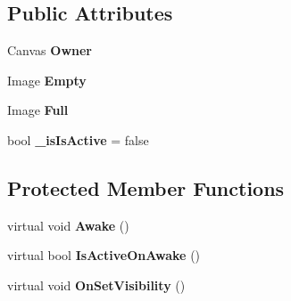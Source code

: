 \subsection*{Public Attributes}
\begin{DoxyCompactItemize}
\item 
\hypertarget{class_skyrates_1_1_u_i_1_1_u_i_state_cooldown_3_01_t_01_4_a4d58720f0cc4a016d95b79027c5e0178}{Canvas {\bfseries Owner}}\label{class_skyrates_1_1_u_i_1_1_u_i_state_cooldown_3_01_t_01_4_a4d58720f0cc4a016d95b79027c5e0178}

\item 
\hypertarget{class_skyrates_1_1_u_i_1_1_u_i_state_cooldown_3_01_t_01_4_adadcc8bd4729c16a176d072ceb198606}{Image {\bfseries Empty}}\label{class_skyrates_1_1_u_i_1_1_u_i_state_cooldown_3_01_t_01_4_adadcc8bd4729c16a176d072ceb198606}

\item 
\hypertarget{class_skyrates_1_1_u_i_1_1_u_i_state_cooldown_3_01_t_01_4_aec87c37028e18ccdf49cacb1067c16ca}{Image {\bfseries Full}}\label{class_skyrates_1_1_u_i_1_1_u_i_state_cooldown_3_01_t_01_4_aec87c37028e18ccdf49cacb1067c16ca}

\item 
\hypertarget{class_skyrates_1_1_u_i_1_1_u_i_state_cooldown_3_01_t_01_4_a1df77fa1980875c70beb8aa0aed4d74f}{bool {\bfseries \-\_\-is\-Is\-Active} = false}\label{class_skyrates_1_1_u_i_1_1_u_i_state_cooldown_3_01_t_01_4_a1df77fa1980875c70beb8aa0aed4d74f}

\end{DoxyCompactItemize}
\subsection*{Protected Member Functions}
\begin{DoxyCompactItemize}
\item 
\hypertarget{class_skyrates_1_1_u_i_1_1_u_i_state_cooldown_3_01_t_01_4_a31f4f137a050b6e413ab93e89828147b}{virtual void {\bfseries Awake} ()}\label{class_skyrates_1_1_u_i_1_1_u_i_state_cooldown_3_01_t_01_4_a31f4f137a050b6e413ab93e89828147b}

\item 
\hypertarget{class_skyrates_1_1_u_i_1_1_u_i_state_cooldown_3_01_t_01_4_aca819fbe071c9c8410cca11a1cfb7005}{virtual bool {\bfseries Is\-Active\-On\-Awake} ()}\label{class_skyrates_1_1_u_i_1_1_u_i_state_cooldown_3_01_t_01_4_aca819fbe071c9c8410cca11a1cfb7005}

\item 
\hypertarget{class_skyrates_1_1_u_i_1_1_u_i_state_cooldown_3_01_t_01_4_a691441b4ceb07b511f1da70f7ea39ac0}{virtual void {\bfseries On\-Set\-Visibility} ()}\label{class_skyrates_1_1_u_i_1_1_u_i_state_cooldown_3_01_t_01_4_a691441b4ceb07b511f1da70f7ea39ac0}

\end{DoxyCompactItemize}
